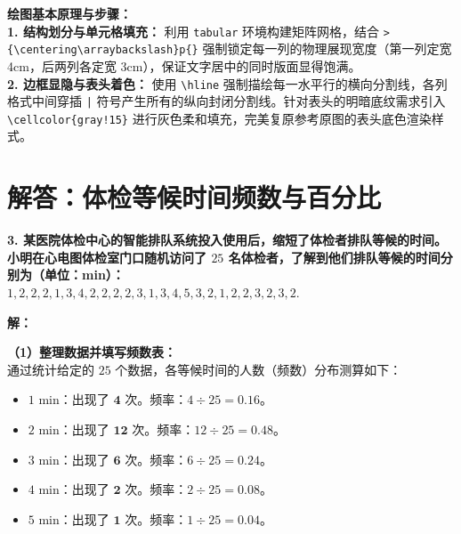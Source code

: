 \documentclass[12pt, a4paper]{ctexrep}
\begin{document}
\vspace{0.6cm}

{\small\color{blue!70!black}
\textbf{绘图基本原理与步骤：}\\
\textbf{1. 结构划分与单元格填充：} 利用 \texttt{tabular} 环境构建矩阵网格，结合 \texttt{>\{\textbackslash centering\textbackslash arraybackslash\}p\{\}} 强制锁定每一列的物理展现宽度（第一列定宽 4cm，后两列各定宽 3cm），保证文字居中的同时版面显得饱满。\\
\textbf{2. 边框显隐与表头着色：} 使用 \texttt{\textbackslash hline} 强制描绘每一水平行的横向分割线，各列格式中间穿插 \texttt{|} 符号产生所有的纵向封闭分割线。针对表头的明暗底纹需求引入 \texttt{\textbackslash cellcolor\{gray!15\}} 进行灰色柔和填充，完美复原参考原图的表头底色渲染样式。
}

\newpage

\section{解答：体检等候时间频数与百分比}

\vspace{0.6cm}

\textbf{3. 某医院体检中心的智能排队系统投入使用后，缩短了体检者排队等候的时间。小明在心电图体检室门口随机访问了 $25$ 名体检者，了解到他们排队等候的时间分别为（单位：min）：\\
$1, 2, 2, 2, 1, 3, 4, 2, 2, 2, 2, 3, 1, 3, 4, 5, 3, 2, 1, 2, 2, 3, 2, 3, 2.$}

\vspace{0.4cm}

\textbf{解：}

\textbf{（1）整理数据并填写频数表：} \\
通过统计给定的 $25$ 个数据，各等候时间的人数（频数）分布测算如下：
\begin{itemize}
  \item \textbf{$1\text{ min}$}：出现了 $\boldsymbol{4}$ 次。频率：$4 \div 25 = \boldsymbol{0.16}$。
  \item \textbf{$2\text{ min}$}：出现了 $\boldsymbol{12}$ 次。频率：$12 \div 25 = \boldsymbol{0.48}$。
  \item \textbf{$3\text{ min}$}：出现了 $\boldsymbol{6}$ 次。频率：$6 \div 25 = \boldsymbol{0.24}$。
  \item \textbf{$4\text{ min}$}：出现了 $\boldsymbol{2}$ 次。频率：$2 \div 25 = \boldsymbol{0.08}$。
  \item \textbf{$5\text{ min}$}：出现了 $\boldsymbol{1}$ 次。频率：$1 \div 25 = \boldsymbol{0.04}$。
\end{itemize}
\end{document}
